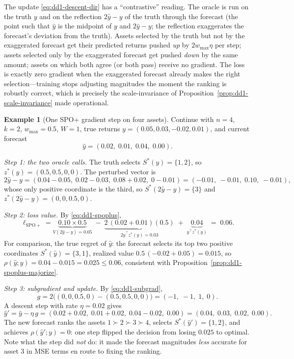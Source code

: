 \documentclass[11pt,a4paper]{article}
\theoremstyle{definition}
\newtheorem{example}{Example}[section]
\theoremstyle{plain}
\begin{document}
\begin{intuition}
The update \eqref{eq:dd1-descent-dir} has a ``contrastive'' reading. The
oracle is run on the truth $y$ and on the reflection $2\hat{y} - y$ of the
truth through the forecast (the point such that $\hat{y}$ is the midpoint of
$y$ and $2\hat{y} - y$; the reflection exaggerates the forecast's deviation
from the truth). Assets selected by the truth but not by the exaggerated
forecast get their predicted returns pushed \emph{up} by $2 w_{\max} \eta$ per
step; assets selected only by the exaggerated forecast get pushed \emph{down}
by the same amount; assets on which both agree (or both pass) receive no
gradient. The loss is exactly zero gradient when the exaggerated forecast
already makes the right selection---training stops adjusting magnitudes the
moment the ranking is robustly correct, which is precisely the
scale-invariance of Proposition~\ref{prop:dd1-scale-invariance} made
operational.
\end{intuition}

\begin{example}[One SPO+ gradient step on four assets]
\label{ex:dd1-spoplus-step}
Continue with $n = 4$, $k = 2$, $w_{\max} = 0.5$, $W = 1$, true returns
$y = (0.05, 0.03, -0.02, 0.01)$, and current forecast
\[
\hat{y} = (0.02,\; 0.01,\; 0.04,\; 0.00).
\]

\emph{Step 1: the two oracle calls.} The truth selects
$S^*(y) = \{1, 2\}$, so $z^*(y) = (0.5, 0.5, 0, 0)$. The perturbed vector is
\[
2\hat{y} - y = (0.04 - 0.05,\; 0.02 - 0.03,\; 0.08 + 0.02,\; 0 - 0.01)
= (-0.01,\; -0.01,\; 0.10,\; -0.01),
\]
whose only positive coordinate is the third, so
$S^*(2\hat{y} - y) = \{3\}$ and $z^*(2\hat{y} - y) = (0, 0, 0.5, 0)$.

\emph{Step 2: loss value.} By \eqref{eq:dd1-spoplus},
\[
\ell_{\mathrm{SPO+}} = \underbrace{0.10 \times 0.5}_{V(2\hat y - y) = 0.05}
\;-\; \underbrace{2\,(0.02 + 0.01)(0.5)}_{2\hat{y}^\top z^*(y) = 0.03}
\;+\; \underbrace{0.04}_{y^\top z^*(y)} \;=\; 0.06 .
\]
For comparison, the true regret of $\hat{y}$: the forecast selects its top
two positive coordinates $S^*(\hat{y}) = \{3, 1\}$, realized value
$0.5\,(-0.02 + 0.05) = 0.015$, so
$\rho(\hat{y}; y) = 0.04 - 0.015 = 0.025 \le 0.06$, consistent with
Proposition~\ref{prop:dd1-spoplus-majorize}.

\emph{Step 3: subgradient and update.} By \eqref{eq:dd1-subgrad},
\[
g = 2\bigl( (0, 0, 0.5, 0) - (0.5, 0.5, 0, 0) \bigr)
= (-1,\; -1,\; 1,\; 0).
\]
A descent step with rate $\eta = 0.02$ gives
\[
\hat{y}' = \hat{y} - \eta\, g
= (0.02 + 0.02,\; 0.01 + 0.02,\; 0.04 - 0.02,\; 0.00)
= (0.04,\; 0.03,\; 0.02,\; 0.00).
\]
The new forecast ranks the assets $1 \succ 2 \succ 3 \succ 4$, selects
$S^*(\hat{y}') = \{1, 2\}$, and achieves $\rho(\hat{y}'; y) = 0$: one step
flipped the decision from losing $0.025$ to optimal. Note what the step did
\emph{not} do: it made the forecast magnitudes \emph{less} accurate for asset
$3$ in MSE terms en route to fixing the ranking.
\end{example}
\end{document}
